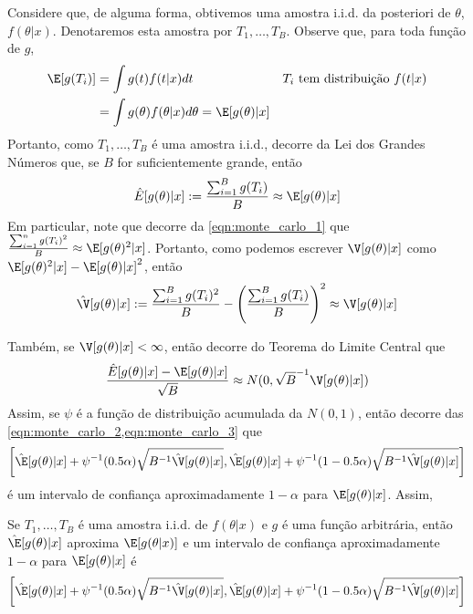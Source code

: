 Considere que, de alguma forma, obtivemos uma
amostra i.i.d. da posteriori de $\theta$, $f(\theta|x)$.
Denotaremos esta amostra por $T_{1},\ldots,T_{B}$.
Observe que, para toda função de $g$,
\begin{align*}
 \E[g(T_{i})]
 &= \int{g(t)f(t|x)dt}
 & \text{$T_{i}$ tem distribuição $f(t|x)$} \\
 &= \int{g(\theta)f(\theta|x)d\theta}
 = \E[g(\theta)|x]
\end{align*}
Portanto, como $T_{1},\ldots,T_{B}$ é uma amostra i.i.d.,
decorre da Lei dos Grandes Números que, se
$B$ for suficientemente grande, então
\begin{align}
 \label{eqn:monte_carlo_1}
 \hat{E}[g(\theta)|x]
 := \frac{\sum_{i=1}^{B}{g(T_{i})}}{B}
 \approx \E[g(\theta)|x]
\end{align}
Em particular, note que decorre da
\cref{eqn:monte_carlo_1} que
$\frac{\sum_{i=1}^{n}{g(T_{i})^{2}}}{B} \approx \E[g(\theta)^{2}|x]$.
Portanto, como podemos escrever
$\V[g(\theta)|x]$ como
$\E[g(\theta)^{2}|x]-\E[g(\theta)|x]^{2}$, então
\begin{align}
 \label{eqn:monte_carlo_2}
 \hat{\V}[g(\theta)|x]
 := \frac{\sum_{i=1}^{B}{g(T_{i})^{2}}}{B}
 -\left(\frac{\sum_{i=1}^{B}{g(T_{i})}}{B}\right)^{2}
 \approx \V[g(\theta)|x]
\end{align}

Também, se $\V[g(\theta)|x] < \infty$, então
decorre do Teorema do Limite Central que
\begin{align}
 \label{eqn:monte_carlo_3}
 \frac{\hat{E}[g(\theta)|x]-\E[g(\theta)|x]}{\sqrt{B}}
 \approx N(0,\sqrt{B}^{-1}\V[g(\theta)|x])
\end{align}
Assim, se $\psi$ é a função de distribuição acumulada da
$N(0,1)$, então decorre das
\cref{eqn:monte_carlo_2,eqn:monte_carlo_3} que
\begin{align}
 \label{eqn:monte_carlo_4}
 \left[\hat{\E}[g(\theta)|x]
 +\psi^{-1}(0.5\alpha)\sqrt{B^{-1}\hat{\V}[g(\theta)|x]},
 \hat{\E}[g(\theta)|x]
 +\psi^{-1}(1-0.5\alpha)
 \sqrt{B^{-1}\hat{\V}[g(\theta)|x]}\right]
\end{align}
é um intervalo de confiança aproximadamente
$1-\alpha$ para $\E[g(\theta)|x]$.
Assim,
\begin{theorem}
 \label{thm:monte_carlo}
 Se $T_{1},\ldots,T_{B}$ é uma amostra i.i.d. de 
 $f(\theta|x)$ e $g$ é uma função arbitrária, então
 $\hat{\E}[g(\theta)|x]$ aproxima $\E[g(\theta|x)]$ e 
 um intervalo de confiança aproximadamente $1-\alpha$ para
 $\E[g(\theta)|x]$ é
 \begin{align*}
  \left[\hat{\E}[g(\theta)|x]
  +\psi^{-1}(0.5\alpha)\sqrt{B^{-1}\hat{\V}[g(\theta)|x]},
  \hat{\E}[g(\theta)|x]+\psi^{-1}(1-0.5\alpha)
  \sqrt{B^{-1}\hat{\V}[g(\theta)|x]}\right]
 \end{align*}
\end{theorem}

